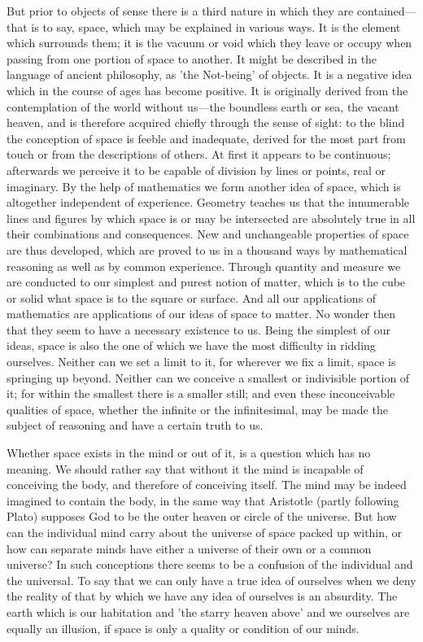 \documentclass[11pt,letter]{article}
\begin{document}
\par  But prior to objects of sense there is a third nature in which they are contained—that is to say, space, which may be explained in various ways. It is the element which surrounds them; it is the vacuum or void which they leave or occupy when passing from one portion of space to another. It might be described in the language of ancient philosophy, as 'the Not-being' of objects. It is a negative idea which in the course of ages has become positive. It is originally derived from the contemplation of the world without us—the boundless earth or sea, the vacant heaven, and is therefore acquired chiefly through the sense of sight: to the blind the conception of space is feeble and inadequate, derived for the most part from touch or from the descriptions of others. At first it appears to be continuous; afterwards we perceive it to be capable of division by lines or points, real or imaginary. By the help of mathematics we form another idea of space, which is altogether independent of experience. Geometry teaches us that the innumerable lines and figures by which space is or may be intersected are absolutely true in all their combinations and consequences. New and unchangeable properties of space are thus developed, which are proved to us in a thousand ways by mathematical reasoning as well as by common experience. Through quantity and measure we are conducted to our simplest and purest notion of matter, which is to the cube or solid what space is to the square or surface. And all our applications of mathematics are applications of our ideas of space to matter. No wonder then that they seem to have a necessary existence to us. Being the simplest of our ideas, space is also the one of which we have the most difficulty in ridding ourselves. Neither can we set a limit to it, for wherever we fix a limit, space is springing up beyond. Neither can we conceive a smallest or indivisible portion of it; for within the smallest there is a smaller still; and even these inconceivable qualities of space, whether the infinite or the infinitesimal, may be made the subject of reasoning and have a certain truth to us.

\par  Whether space exists in the mind or out of it, is a question which has no meaning. We should rather say that without it the mind is incapable of conceiving the body, and therefore of conceiving itself. The mind may be indeed imagined to contain the body, in the same way that Aristotle (partly following Plato) supposes God to be the outer heaven or circle of the universe. But how can the individual mind carry about the universe of space packed up within, or how can separate minds have either a universe of their own or a common universe? In such conceptions there seems to be a confusion of the individual and the universal. To say that we can only have a true idea of ourselves when we deny the reality of that by which we have any idea of ourselves is an absurdity. The earth which is our habitation and 'the starry heaven above' and we ourselves are equally an illusion, if space is only a quality or condition of our minds.
\end{document}
